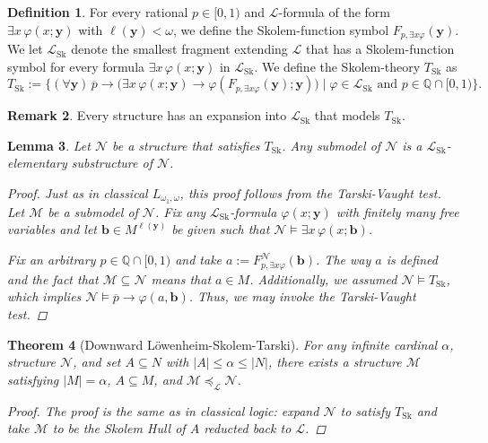 \documentclass{amsart}
\newtheorem{theorem}{Theorem}[section]
\newtheorem{lemma}[theorem]{Lemma}
\theoremstyle{definition}
\newtheorem{remark}[theorem]{Remark}
\newtheorem{definition}[theorem]{Definition}
\numberwithin{equation}{theorem}
\renewcommand{\phi}{\varphi}
\newcommand{\Q}{\mathbb{Q}}
\newcommand{\V}{\mathbf}
\newcommand{\where}{\mid}
\newcommand{\rat}[1]{{\overline{#1}}}
\newcommand{\narrow}[1]{\xrightarrow{#1}}
\renewcommand{\to}{\narrow{}}
\newcommand{\len}{\ell}
\newcommand{\Tskolem}{{T_\text{Sk}}}
\newcommand{\frag}{\mathcal{L}}
\newcommand{\fragsk}{\frag_{\text{Sk}}}
\newcommand{\skolem}[2]{F_{{#1},{#2}}}
\begin{document}
\begin{definition}
  For every rational $p\in[0,1)$ and $\frag$-formula of the form $\exists x\,\phi(x;\V y)$ with $\len(\V y)<\omega$, we define the Skolem-function symbol $\skolem p{\exists x\phi}(\V y)$.
  We let $\fragsk$ denote the smallest fragment extending $\frag$ that has a Skolem-function symbol for every formula $\exists x\,\phi(x;\V y)$ in $\fragsk$.
  We define the Skolem-theory $\Tskolem$ as
  \[
    \Tskolem:=\Big\{(\forall\V y)\,\rat p\to\Big(\exists x\,\phi(x;\V y)\to\phi(\skolem p{\exists x\phi}(\V y);\V y)\Big)\where \phi\in\fragsk\text{ and }p\in\Q\cap[0,1)\Big\}.
  \]
\end{definition}

\begin{remark}
  Every structure has an expansion into $\fragsk$ that models $\Tskolem$.
\end{remark}

\begin{lemma}
  Let $\mathcal N$ be a structure that satisfies $\Tskolem$.
  Any submodel of $\mathcal N$ is a $\fragsk$-elementary substructure of $\mathcal N$.
  \begin{proof}
    Just as in classical $L_{\omega_1,\omega}$, this proof follows from the Tarski-Vaught test.
    Let $\mathcal M$ be a submodel of $\mathcal N$.
    Fix any $\fragsk$-formula $\phi(x;\V y)$ with finitely many free variables and let $\V b\in M^{\len(\V y)}$ be given such that $\mathcal N\models\exists x\,\phi(x;\V b)$.
    
    Fix an arbitrary $p\in\Q\cap[0,1)$ and take $a:=\skolem p{\exists x\phi}^\mathcal N(\V b)$.
    The way $a$ is defined and the fact that $\mathcal M\subseteq\mathcal N$ means that $a\in M$.
    Additionally, we assumed $\mathcal N\models \Tskolem$, which implies $\mathcal N\models \rat p\to\phi(a,\V b)$.
    Thus, we may invoke the Tarski-Vaught test.
  \end{proof}
\end{lemma}

\begin{theorem}[Downward L\"owenheim-Skolem-Tarski]
  For any infinite cardinal $\alpha$, structure $\mathcal N$, and set $A\subseteq N$ with $|A|\leq\alpha\leq|N|$, there exists a structure $\mathcal M$ satisfying $|M|=\alpha$, $A\subseteq M$, and $\mathcal M\preceq_\frag\mathcal N$.
  
  \begin{proof}
    The proof is the same as in classical logic: expand $\mathcal N$ to satisfy $\Tskolem$ and take $\mathcal M$ to be the Skolem Hull of $A$ reducted back to $\frag$.
  \end{proof}
\end{theorem}
\end{document}
